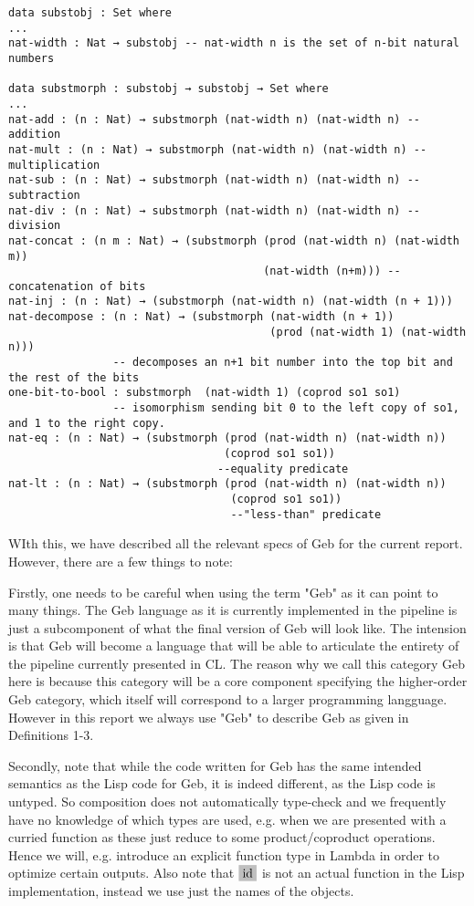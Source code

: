 \begin{verbatim}
data substobj : Set where
...
nat-width : Nat → substobj -- nat-width n is the set of n-bit natural numbers

data substmorph : substobj → substobj → Set where
...
nat-add : (n : Nat) → substmorph (nat-width n) (nat-width n) --addition
nat-mult : (n : Nat) → substmorph (nat-width n) (nat-width n) --multiplication
nat-sub : (n : Nat) → substmorph (nat-width n) (nat-width n) --subtraction
nat-div : (n : Nat) → substmorph (nat-width n) (nat-width n) --division 
nat-concat : (n m : Nat) → (substmorph (prod (nat-width n) (nat-width m))
                                       (nat-width (n+m))) -- concatenation of bits
nat-inj : (n : Nat) → (substmorph (nat-width n) (nat-width (n + 1)))
nat-decompose : (n : Nat) → (substmorph (nat-width (n + 1)) 
                                        (prod (nat-width 1) (nat-width n)))
                -- decomposes an n+1 bit number into the top bit and the rest of the bits
one-bit-to-bool : substmorph  (nat-width 1) (coprod so1 so1)
                -- isomorphism sending bit 0 to the left copy of so1, and 1 to the right copy.
nat-eq : (n : Nat) → (substmorph (prod (nat-width n) (nat-width n)) 
                                 (coprod so1 so1))
                                --equality predicate
nat-lt : (n : Nat) → (substmorph (prod (nat-width n) (nat-width n))
                                  (coprod so1 so1))
                                  --"less-than" predicate
\end{verbatim}

WIth this, we have described all the relevant specs of Geb for the current report. However, there are a few things to note:

Firstly, one needs to be careful when using the term "Geb" as it can point to many things. The Geb language as it is currently implemented in the pipeline is just a subcomponent of what the final version of Geb will look like. The intension is that Geb will become a language that will be able to articulate the entirety of the pipeline currently presented in CL. The reason why we call this category Geb here is because this category will be a core component specifying the higher-order Geb category, which itself will correspond to a larger programming langguage. However in this report we always use "Geb" to describe Geb as given in Definitions 1-3.

Secondly, note that while the code written for Geb has the same intended semantics as the Lisp code for Geb, it is indeed different, as the Lisp code is untyped. So composition does not automatically type-check and we frequently have no knowledge of which types are used, e.g. when we are presented with a curried function as these just reduce to some product/coproduct operations. Hence we will, e.g. introduce an explicit function type in Lambda in order to optimize certain outputs. Also note that $\colorbox{gray!50}{id}$ is not an actual function in the Lisp implementation, instead we use just the names of the objects.
 
